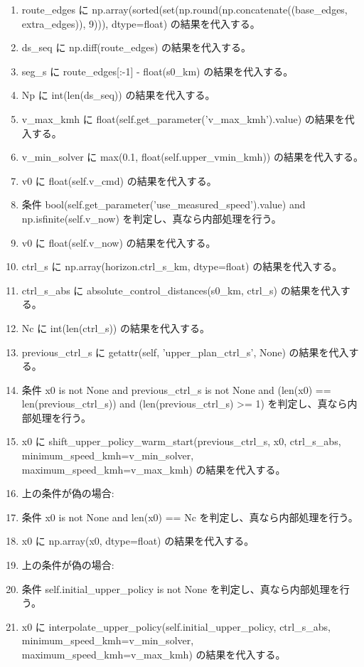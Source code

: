 \documentclass[a4paper,11pt]{article}
\begin{document}
\begin{enumerate}[leftmargin=1.8em]
\item   route\_edges に np.array(sorted(set(np.round(np.concatenate((base\_edges, extra\_edges)), 9))), dtype=float) の結果を代入する。
\item   ds\_seq に np.diff(route\_edges) の結果を代入する。
\item   seg\_s に route\_edges[:-1] - float(s0\_km) の結果を代入する。
\item   Np に int(len(ds\_seq)) の結果を代入する。
\item v\_max\_kmh に float(self.get\_parameter('v\_max\_kmh').value) の結果を代入する。
\item v\_min\_solver に max(0.1, float(self.upper\_vmin\_kmh)) の結果を代入する。
\item v0 に float(self.v\_cmd) の結果を代入する。
\item 条件 bool(self.get\_parameter('use\_measured\_speed').value) and np.isfinite(self.v\_now) を判定し、真なら内部処理を行う。
\item   v0 に float(self.v\_now) の結果を代入する。
\item ctrl\_s に np.array(horizon.ctrl\_s\_km, dtype=float) の結果を代入する。
\item ctrl\_s\_abs に absolute\_control\_distances(s0\_km, ctrl\_s) の結果を代入する。
\item Nc に int(len(ctrl\_s)) の結果を代入する。
\item previous\_ctrl\_s に getattr(self, 'upper\_plan\_ctrl\_s', None) の結果を代入する。
\item 条件 x0 is not None and previous\_ctrl\_s is not None and (len(x0) == len(previous\_ctrl\_s)) and (len(previous\_ctrl\_s) >= 1) を判定し、真なら内部処理を行う。
\item   x0 に shift\_upper\_policy\_warm\_start(previous\_ctrl\_s, x0, ctrl\_s\_abs, minimum\_speed\_kmh=v\_min\_solver, maximum\_speed\_kmh=v\_max\_kmh) の結果を代入する。
\item   上の条件が偽の場合:
\item   条件 x0 is not None and len(x0) == Nc を判定し、真なら内部処理を行う。
\item     x0 に np.array(x0, dtype=float) の結果を代入する。
\item     上の条件が偽の場合:
\item     条件 self.initial\_upper\_policy is not None を判定し、真なら内部処理を行う。
\item       x0 に interpolate\_upper\_policy(self.initial\_upper\_policy, ctrl\_s\_abs, minimum\_speed\_kmh=v\_min\_solver, maximum\_speed\_kmh=v\_max\_kmh) の結果を代入する。

\end{enumerate}
\end{document}
